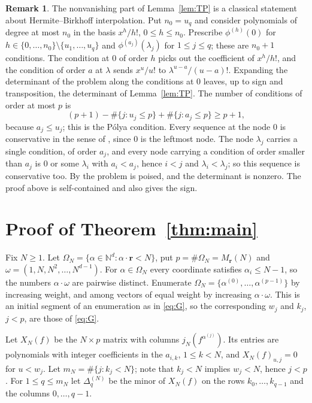 \documentclass{amsart}
\theoremstyle{definition}
\newtheorem{remark}[theorem]{Remark}
\numberwithin{equation}{section}
\newcommand{\N}{\mathbb{N}}
\newcommand{\bfr}{\mathbf{r}}
\begin{document}
\begin{remark}\label{rem:HB}
The nonvanishing part of Lemma~\ref{lem:TP} is a classical statement about
Hermite--Birkhoff interpolation. Put $n_0=u_q$ and consider polynomials of
degree at most $n_0$ in the basis $x^h/h!$, $0\le h\le n_0$. Prescribe
$\phi^{(h)}(0)$ for $h\in\{0,\dots,n_0\}\setminus\{u_1,\dots,u_q\}$ and
$\phi^{(a_j)}(\lambda_j)$ for $1\le j\le q$; these are $n_0+1$ conditions. The condition at $0$ of order
$h$ picks out the coefficient of $x^h/h!$, and the condition of order $a$ at
$\lambda$ sends $x^u/u!$ to $\lambda^{u-a}/(u-a)!$. Expanding the determinant
of the problem along the conditions at $0$ leaves, up to sign and
transposition, the determinant of Lemma~\ref{lem:TP}. The number of
conditions of order at most $p$ is
\[
  (p+1)-\#\{j:u_j\le p\}+\#\{j:a_j\le p\}\ge p+1,
\]
because $a_j\le u_j$; this is the P\'olya condition. Every sequence at the
node $0$ is conservative in the sense of \cite[Definition~2]{AS}, since $0$
is the leftmost node. The node $\lambda_j$ carries a single condition, of
order $a_j$, and every node carrying a condition of order smaller than $a_j$ is
$0$ or some $\lambda_i$ with $a_i<a_j$, hence $i<j$ and $\lambda_i<\lambda_j$;
so this sequence is conservative too. By \cite[Theorem~2]{AS} the problem is
poised, and the determinant is nonzero. The proof above is self-contained and
also gives the sign.
\end{remark}

\section{Proof of Theorem~\ref{thm:main}}\label{sec:proof}

Fix $N\ge1$. Let $\Omega_N=\{\alpha\in\N^d:\alpha\cdot\bfr<N\}$, put
$p=\#\Omega_N=M_{\bfr}(N)$ and $\omega=(1,N,N^2,\dots,N^{d-1})$. For
$\alpha\in\Omega_N$ every coordinate satisfies $\alpha_i\le N-1$, so the
numbers $\alpha\cdot\omega$ are pairwise distinct. Enumerate
$\Omega_N=\{\alpha^{(0)},\dots,\alpha^{(p-1)}\}$ by increasing weight, and
among vectors of equal weight by increasing $\alpha\cdot\omega$. This is an
initial segment of an enumeration as in \eqref{eq:G}, so the
corresponding $w_j$ and $k_j$, $j<p$, are those of \eqref{eq:G}.

Let $X_N(f)$ be the $N\times p$ matrix with columns $j_N(f^{\alpha^{(j)}})$.
Its entries are polynomials with integer coefficients in the $a_{i,k}$,
$1\le k<N$, and $X_N(f)_{u,j}=0$ for $u<w_j$. Let $m_N=\#\{j:k_j<N\}$; note
that $k_j<N$ implies $w_j<N$, hence $j<p$. For $1\le q\le m_N$ let
$\Delta_q^{(N)}$ be the minor of $X_N(f)$ on the rows $k_0,\dots,k_{q-1}$ and
the columns $0,\dots,q-1$.
\end{document}
